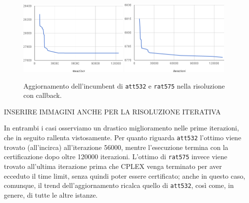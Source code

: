 \begin{figure}
  \begin{center}
    \includegraphics[width=0.48\textwidth]{images/att532aggiornamento}
    \includegraphics[width=0.48\textwidth]{images/rat575aggiornamento}
    \caption{Aggiornamento dell'incumbent di \texttt{att532} e \texttt{rat575} nella risoluzione con callback.}
    \label{fig:updatingincumbent}
  \end{center}
\end{figure}

INSERIRE IMMAGINI ANCHE PER LA RISOLUZIONE ITERATIVA

In entrambi i casi osserviamo un drastico miglioramento nelle prime iterazioni, che in seguito rallenta vistosamente. Per quanto riguarda \texttt{att532} l'ottimo viene trovato (all'incirca) all'iterazione 56000, mentre l'esecuzione termina con la certificazione dopo oltre 120000 iterazioni. L'ottimo di \texttt{rat575} invece viene trovato all'ultima iterazione prima che CPLEX venga terminato per aver ecceduto il time limit, senza quindi poter essere certificato; anche in questo caso, comunque, il trend dell'aggiornamento ricalca quello di \texttt{att532}, così come, in genere, di tutte le altre istanze. 

